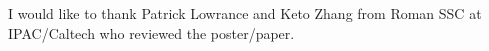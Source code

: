 \documentclass[11pt,twoside]{article}
\begin{document}
\acknowledgements I would like to thank Patrick Lowrance and Keto Zhang from Roman SSC at IPAC/Caltech who reviewed the poster/paper.


\end{document}

